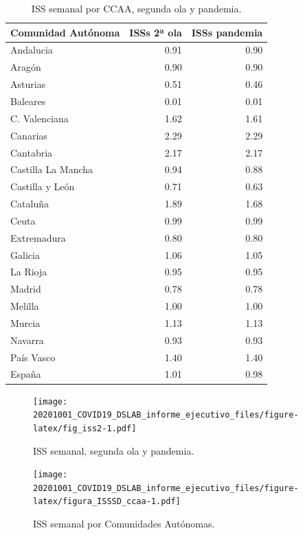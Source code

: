 \documentclass[
  11pt,
]{article}
\begin{document}
\begin{table}[!h]

\caption{\label{tab:tabla2}ISS semanal por CCAA, segunda ola y pandemia.}
\centering
\fontsize{9}{11}\selectfont
\begin{tabular}[t]{l|r|r}
\hline
Comunidad Autónoma & ISSs 2ª ola & ISSs pandemia\\
\hline
Andalucia & 0.91 & 0.90\\
\hline
Aragón & 0.90 & 0.90\\
\hline
Asturias & 0.51 & 0.46\\
\hline
Baleares & 0.01 & 0.01\\
\hline
C. Valenciana & 1.62 & 1.61\\
\hline
Canarias & 2.29 & 2.29\\
\hline
Cantabria & 2.17 & 2.17\\
\hline
Castilla La Mancha & 0.94 & 0.88\\
\hline
Castilla y León & 0.71 & 0.63\\
\hline
Cataluña & 1.89 & 1.68\\
\hline
Ceuta & 0.99 & 0.99\\
\hline
Extremadura & 0.80 & 0.80\\
\hline
Galicia & 1.06 & 1.05\\
\hline
La Rioja & 0.95 & 0.95\\
\hline
Madrid & 0.78 & 0.78\\
\hline
Melilla & 1.00 & 1.00\\
\hline
Murcia & 1.13 & 1.13\\
\hline
Navarra & 0.93 & 0.93\\
\hline
País Vasco & 1.40 & 1.40\\
\hline
España & 1.01 & 0.98\\
\hline
\end{tabular}
\end{table}

\begin{figure}
\centering
\texttt{[image: 20201001\_COVID19\_DSLAB\_informe\_ejecutivo\_files/figure-latex/fig\_iss2-1.pdf]}
\caption{\label{fig:fig_iss2} ISS semanal, segunda ola y pandemia.}
\end{figure}

\begin{figure}
\centering
\texttt{[image: 20201001\_COVID19\_DSLAB\_informe\_ejecutivo\_files/figure-latex/figura\_ISSSD\_ccaa-1.pdf]}
\caption{\label{fig:figura_ISSSD_ccaa} ISS semanal por Comunidades
Autónomas.}
\end{figure}
\end{document}

